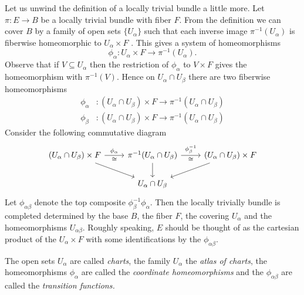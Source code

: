 \documentclass[ma3408.tex]{subfiles}
\begin{document}
\begin{Rem}
Let us unwind the definition of a locally trivial bundle a little more. Let $\pi \colon E \to B$ be a locally trivial bundle with fiber $F$. From the definition we can cover $B$ by a family of open sets $\{ U_{\alpha} \}$ such that each inverse image $\pi^{-1}(U_{\alpha})$ is fiberwise homeomorphic to $U_{\alpha} \times F$ . This gives a system of homeomorphisms
\[
\phi_{\alpha} \colon U_{\alpha} \times F \to \pi^{-1}(U_{\alpha}). 
\]
Observe that if $V \subseteq U_{\alpha}$ then the restriction of $\phi_{\alpha}$ to $V \times F$ gives the homeomorphism with $\pi^{-1}(V)$. Hence on $U_{\alpha} \cap U_{\beta}$ there are two fiberwise homeomorphisms
\[
\begin{split}
\phi_{\alpha} &\colon (U_{\alpha} \cap U_{\beta})\times F \to \pi^{-1}(U_{\alpha} \cap U_{\beta})\\
\phi_{\beta} &\colon (U_{\alpha} \cap U_{\beta})\times F \to \pi^{-1}(U_{\alpha} \cap U_{\beta})
\end{split}
\]
Consider the following commutative diagram
\[\begin{tikzcd}[ampersand replacement=\&]
	{(U_{\alpha} \cap U_{\beta}) \times F} \& {\pi^{-1}(U_{\alpha} \cap U_{\beta})} \& {(U_{\alpha} \cap U_{\beta}) \times F} \\
	\& {U_{\alpha} \cap U_{\beta}}
	\arrow["{\phi_{\alpha}}", "\cong"', from=1-1, to=1-2]
	\arrow["{\phi_{\beta}^{-1}}", "\cong"',from=1-2, to=1-3]
	\arrow[from=1-2, to=2-2]
	\arrow[from=1-1, to=2-2]
	\arrow[from=1-3, to=2-2]
\end{tikzcd}\]
Let $\phi_{\alpha\beta}$ denote the top composite $\phi_{\beta}^{-1}\phi_{\alpha}$. Then the locally trivially bundle is completed determined by the base $B$, the fiber $F$, the covering $U_{\alpha}$ and the homeomorphisms $U_{\alpha\beta}$. Roughly speaking, $E$ should be thought of as the cartesian product of the $U_{\alpha} \times F$ with some identifications by the $\phi_{\alpha\beta}$. 
\end{Rem}
\begin{Def}
The open sets $U_{\alpha}$ are called \emph{charts}, the family $U_{\alpha}$ the \emph{atlas of charts}, the homeomorphisms $\phi_{\alpha}$ are called the \emph{coordinate homeomorphisms} and the $\phi_{\alpha\beta}$ are called the \emph{transition functions.}
\end{Def}
\end{document}
